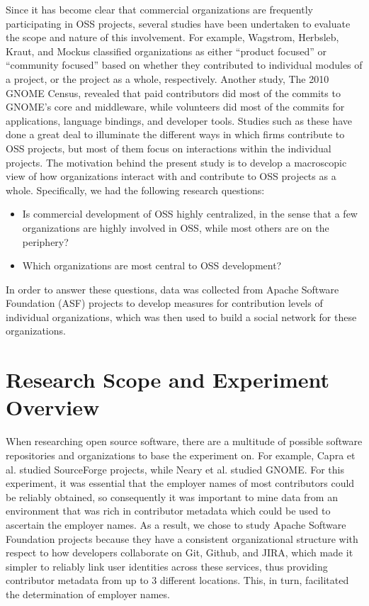Since it has become clear that commercial organizations are frequently participating in OSS projects, several studies have been undertaken to evaluate the scope and nature of this involvement. For example, Wagstrom, Herbsleb, Kraut, and Mockus \cite{wagstrom2010impact} classified organizations as either ``product focused'' or ``community focused'' based on whether they contributed to individual modules of a project, or the project as a whole, respectively. Another study, The 2010 GNOME Census\cite{neary2010gnome}, revealed that paid contributors did most of the commits to GNOME's core and middleware, while volunteers did most of the commits for applications, language bindings, and developer tools. Studies such as these have done a great deal to illuminate the different ways in which firms contribute to OSS projects, but most of them focus on interactions within the individual projects. The motivation behind the present study is to develop a macroscopic view of how organizations interact with and contribute to OSS projects as a whole. Specifically, we had the following research questions:
\begin{itemize}
	\item Is commercial development of OSS highly centralized, in the sense that a few organizations are highly involved in OSS, while most others are on the periphery?
	\item Which organizations are most central to OSS development?
\end{itemize}
In order to answer these questions, data was collected from Apache Software Foundation (ASF) projects to develop measures for contribution levels of individual organizations, which was then used to build a social network for these organizations.

\section{Research Scope and Experiment Overview}
When researching open source software, there are a multitude of possible software repositories and organizations to base the experiment on. For example, Capra et al. studied SourceForge projects, while Neary et al. studied GNOME.  
For this experiment, it was essential that the employer names of most contributors could be reliably obtained, so consequently it was important to mine data from an environment that was rich in contributor metadata which could be used to ascertain the employer names. As a result, we chose to study Apache Software Foundation projects because they have a consistent organizational structure with respect to how developers collaborate on Git, Github, and JIRA, which made it simpler to reliably link user identities across these services, thus providing contributor metadata from up to 3 different locations. This, in turn, facilitated the determination of employer names.

